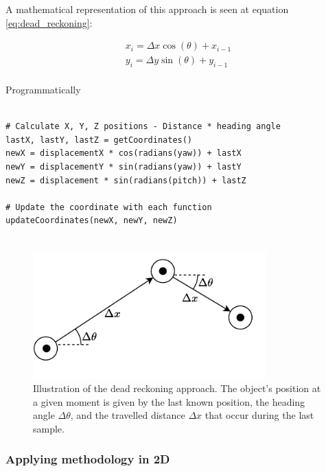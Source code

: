 A mathematical representation of this approach is seen at equation \ref{eq:dead_reckoning}:

\begin{equation}
    \begin{gathered}
        x_i = \Delta x \cos (\theta) + x_{i-1} \\
        y_i = \Delta y \sin (\theta) + y_{i-1} \\
    \end{gathered}
    \label{eq:dead_reckoning}
\end{equation}

Programmatically

\lstset{language=Python}
\begin{lstlisting}[frame=single]  % Start your code-block
    
# Calculate X, Y, Z positions - Distance * heading angle
lastX, lastY, lastZ = getCoordinates()
newX = displacementX * cos(radians(yaw)) + lastX
newY = displacementY * sin(radians(yaw)) + lastY
newZ = displacement * sin(radians(pitch)) + lastZ 

# Update the coordinate with each function
updateCoordinates(newX, newY, newZ)
    
\end{lstlisting}

\begin{figure}[!h]
    \centering
    \includegraphics[width=0.8\textwidth]{figures/dead_reckoning.pdf}
    \caption{Illustration of the dead reckoning approach. The object's position at a given moment is given by the last known position, the heading angle $\Delta \theta$, and the travelled distance $\Delta x$ that occur during the last sample. }
    \label{fig:position}
\end{figure}

\newpage

\subsubsection{Applying methodology in 2D}

